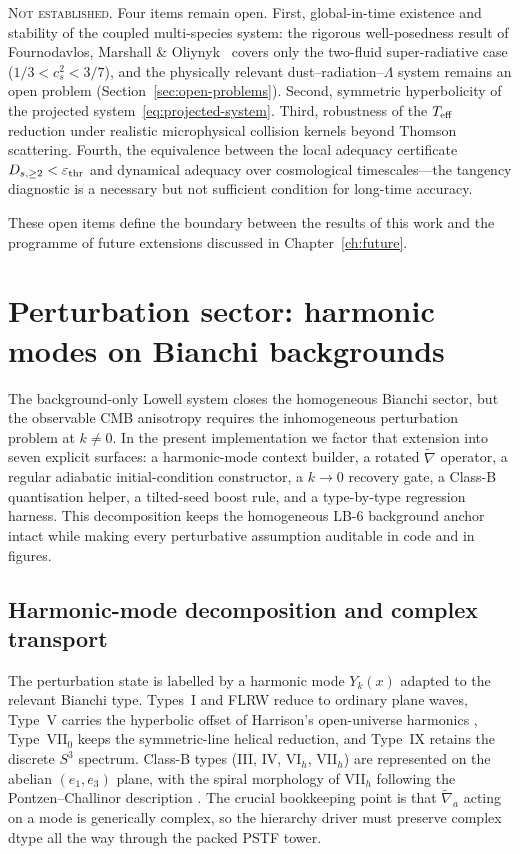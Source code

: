 \medskip\noindent\textsc{Not established.}\enspace
Four items remain open.
First, global-in-time existence and stability of the
coupled multi-species system: the rigorous
well-posedness result of Fournodavlos, Marshall \&
Oliynyk~\cite{FournodavlosMarshallOliynyk2025}
covers only the two-fluid super-radiative case
($1/3 < c_s^2 < 3/7$), and the physically relevant
dust--radiation--$\Lambda$ system remains an open
problem (Section~\ref{sec:open-problems}).
Second, symmetric hyperbolicity of the projected
system~\eqref{eq:projected-system}.
Third, robustness of the $T_{\mathrm{eff}}$ reduction under
realistic microphysical collision kernels beyond
Thomson scattering.
Fourth, the equivalence between the local adequacy
certificate $D_{s,\geq 2} < \varepsilon_{\rm thr}$
and dynamical adequacy over cosmological
timescales---the tangency diagnostic is a
necessary but not sufficient condition for
long-time accuracy.

These open items define the boundary between the
results of this work and the programme of future
extensions discussed in
Chapter~\ref{ch:future}.

\section{Perturbation sector: harmonic modes on Bianchi backgrounds}
\label{sec:perturbation-bianchi-modes}

The background-only Lowell system closes the homogeneous Bianchi
sector, but the observable CMB anisotropy requires the
inhomogeneous perturbation problem at $k \neq 0$.  In the present
implementation we factor that extension into seven explicit
surfaces: a harmonic-mode context builder, a rotated
$\tilde{\nabla}$ operator, a regular adiabatic initial-condition
constructor, a $k \rightarrow 0$ recovery gate, a Class-B
quantisation helper, a tilted-seed boost rule, and a
type-by-type regression harness.  This decomposition keeps the
homogeneous LB-6 background anchor intact while making every
perturbative assumption auditable in code and in figures.

\subsection{Harmonic-mode decomposition and complex transport}

The perturbation state is labelled by a harmonic mode
$Y_k(x)$ adapted to the relevant Bianchi type.  Types~I and
FLRW reduce to ordinary plane waves, Type~V carries the
hyperbolic offset of Harrison's open-universe harmonics
\cite{Harrison1967}, Type~VII$_0$ keeps the symmetric-line helical
reduction, and Type~IX retains the discrete $S^3$ spectrum.
Class-B types (III, IV, VI$_h$, VII$_h$) are represented on the
abelian $(e_1,e_3)$ plane, with the spiral morphology of
VII$_h$ following the Pontzen--Challinor description
\cite{PontzenChallinor2007}.  The crucial bookkeeping point is
that $\tilde{\nabla}_a$ acting on a mode is generically complex,
so the hierarchy driver must preserve complex dtype all the way
through the packed PSTF tower.

